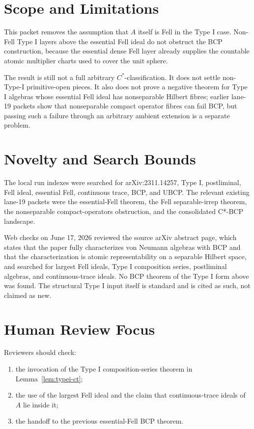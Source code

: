\documentclass[11pt]{article}
\begin{document}
\section*{Scope and Limitations}

This packet removes the assumption that \(A\) itself is Fell in the Type I
case.  Non-Fell Type I layers above the essential Fell ideal do not obstruct
the BCP construction, because the essential dense Fell layer already supplies
the countable atomic multiplier charts used to cover the unit sphere.

The result is still not a full arbitrary \(C^*\)-classification.  It does not
settle non-Type-I primitive-open pieces.  It also does not prove a negative
theorem for Type I algebras whose essential Fell ideal has nonseparable
Hilbert fibres; earlier lane-19 packets show that nonseparable compact
operator fibres can fail BCP, but passing such a failure through an arbitrary
ambient extension is a separate problem.

\section*{Novelty and Search Bounds}

The local run indexes were searched for arXiv:2311.14257, Type I,
postliminal, Fell ideal, essential Fell, continuous trace, BCP, and UBCP.
The relevant existing lane-19 packets were the essential-Fell theorem, the
Fell separable-irrep theorem, the nonseparable compact-operators obstruction,
and the consolidated C*-BCP landscape.

Web checks on June 17, 2026 reviewed the source arXiv abstract page, which
states that the paper fully characterizes von Neumann algebras with BCP and
that the characterization is atomic representability on a separable Hilbert
space, and searched for largest Fell ideals, Type I composition series,
postliminal algebras, and continuous-trace ideals.  No BCP theorem of the
Type I form above was found.  The structural Type I input itself is standard
and is cited as such, not claimed as new.

\section*{Human Review Focus}

Reviewers should check:
\begin{enumerate}
    \item the invocation of the Type I composition-series theorem in
          Lemma~\ref{lem:typei-ct};
    \item the use of the largest Fell ideal and the claim that continuous-trace
          ideals of \(A\) lie inside it;
    \item the handoff to the previous essential-Fell BCP theorem.
\end{enumerate}
\end{document}
